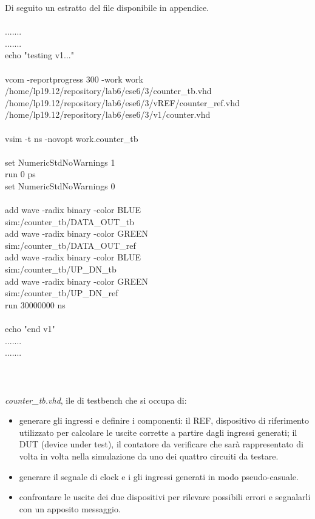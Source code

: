 Di seguito un estratto del file disponibile in appendice.\\
\\
.......\\
.......\\
echo "testing v1..."\\
\\
vcom -reportprogress 300 -work work\\ /home/lp19.12/repository/lab6/ese6/3/counter\_tb.vhd\\ /home/lp19.12/repository/lab6/ese6/3/vREF/counter\_ref.vhd\\ /home/lp19.12/repository/lab6/ese6/3/v1/counter.vhd\\
\\
vsim -t ns -novopt work.counter\_tb\\
\\
set NumericStdNoWarnings 1\\
run 0 ps\\
set NumericStdNoWarnings 0\\
\\
add wave -radix binary   -color BLUE\\      sim:/counter\_tb/DATA\_OUT\_tb\\
add wave -radix binary   -color GREEN\\    sim:/counter\_tb/DATA\_OUT\_ref\\
add wave -radix binary   -color BLUE\\     sim:/counter\_tb/UP\_DN\_tb\\
add wave -radix binary   -color GREEN \\   sim:/counter\_tb/UP\_DN\_ref\\
run 30000000 ns\\
\\
echo "end v1"\\
.......\\
.......\\
\\
\\
\\
\textit{counter\_tb.vhd}, ile di testbench che si occupa di:
\begin{itemize}
	\item {generare gli ingressi e definire i componenti: il REF, dispositivo di riferimento utilizzato per calcolare le uscite corrette a partire dagli ingressi generati; il DUT (device under test), il contatore da verificare che sarà rappresentato di volta in volta nella simulazione da uno dei quattro circuiti da testare.}
	\item {generare il segnale di clock e i gli ingressi generati in modo pseudo-casuale.}
	\item {confrontare le uscite dei due dispositivi per rilevare possibili errori e segnalarli con un apposito messaggio.}
\end{itemize}
